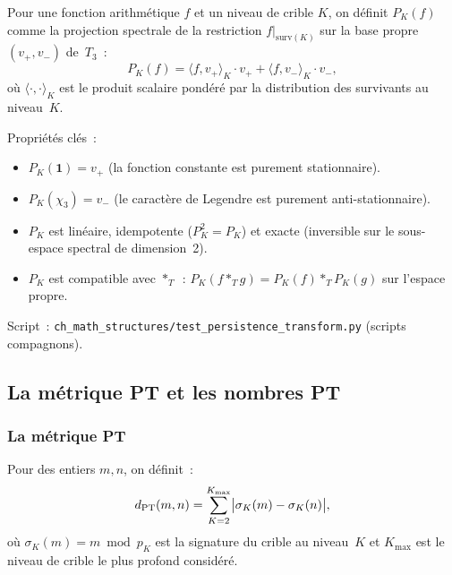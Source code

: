 \documentclass[12pt,a4paper]{article}
\begin{document}
\begin{definition}
\label{def:persistence_transform}
Pour une fonction arithmétique $f$ et un niveau de crible $K$, on
définit $P_K(f)$ comme la projection spectrale de la restriction
$f|_{\mathrm{surv}(K)}$ sur la base propre $(v_+, v_-)$ de~$T_3$~:
\begin{equation}
  P_K(f) = \langle f, v_+ \rangle_K \cdot v_+
          + \langle f, v_- \rangle_K \cdot v_-,
  \label{eq:persistence_transform}
\end{equation}
où $\langle \cdot, \cdot \rangle_K$ est le produit scalaire pondéré
par la distribution des survivants au niveau~$K$.
\end{definition}

Propriétés clés~:
\begin{itemize}[nosep]
\item $P_K(\mathbf{1}) = v_+$ (la fonction constante est purement
  stationnaire).
\item $P_K(\chi_3) = v_-$ (le caractère de Legendre est purement
  anti-stationnaire).
\item $P_K$ est linéaire, idempotente ($P_K^2 = P_K$) et exacte
  (inversible sur le sous-espace spectral de dimension~2).
\item $P_K$ est compatible avec $*_T$~:
  $P_K(f *_T g) = P_K(f) *_T P_K(g)$ sur l'espace propre.
\end{itemize}

Script~: \texttt{ch\_math\_structures/test\_persistence\_transform.py}
(scripts compagnons).


\subsection{La métrique PT et les nombres PT}
\label{sec:ms_metric}

\subsubsection{La métrique PT}

\begin{definition}[Distance PT]
\label{def:pt_metric}
Pour des entiers $m, n$, on définit~:
\begin{equation}
  d_{\rm PT}(m, n) = \sum_{K=2}^{K_{\max}}
    \bigl| \sigma_K(m) - \sigma_K(n) \bigr|,
  \label{eq:pt_metric}
\end{equation}
où $\sigma_K(m) = m \bmod p_K$ est la signature du crible au
niveau~$K$ et $K_{\max}$ est le niveau de crible le plus profond
considéré.
\end{definition}
\end{document}
